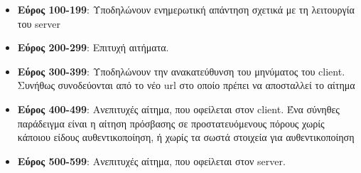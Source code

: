 \begin{itemize}
	\item \textbf{Εύρος 100-199}: Υποδηλώνουν ενημερωτική απάντηση σχετικά με τη λειτουργία του server
	\item \textbf{Εύρος 200-299}: Επιτυχή αιτήματα. 
	\item \textbf{Εύρος 300-399}: Υποδηλώνουν την ανακατεύθυνση του μηνύματος του client. Συνήθως συνοδεύονται από το νέο url στο οποίο πρέπει να αποσταλλεί το αίτημα
	\item \textbf{Εύρος 400-499}: Ανεπιτυχές αίτημα, που οφείλεται στον client. Ένα σύνηθες παράδειγμα είναι η αίτηση πρόσβασης σε προστατευόμενους πόρους χωρίς κάποιου είδους αυθεντικοποίηση, ή χωρίς τα σωστά στοιχεία για αυθεντικοποίηση
	\item \textbf{Εύρος 500-599}: Ανεπιτυχές αίτημα, που οφείλεται στον server. 
\end{itemize}